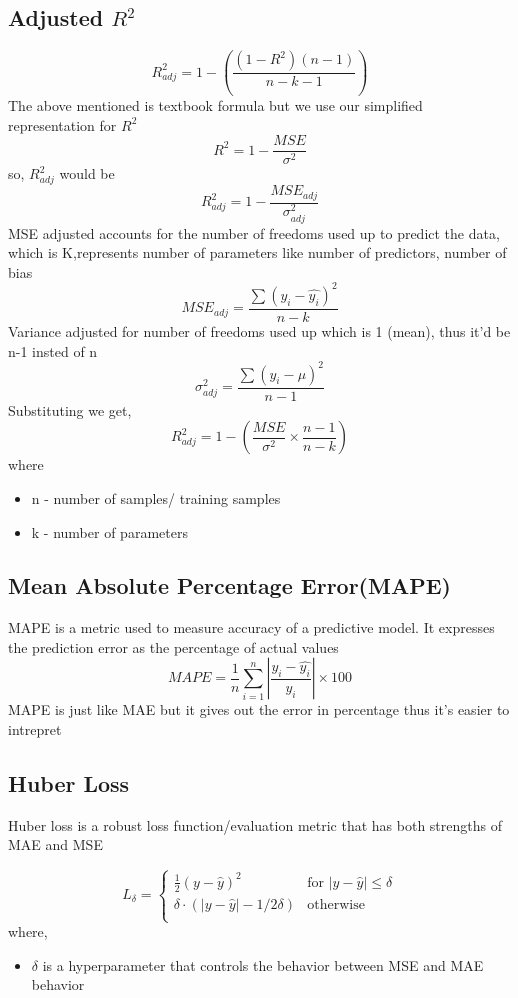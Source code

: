 \documentclass[12pt]{extarticle}
\begin{document}
\subsection{Adjusted \(R^2\)}
$$ R^2_{adj} = 1 - \left(\frac{(1-R^2)(n-1)}{n-k-1}\right) $$
The above mentioned is textbook formula but we use our simplified 
representation for \(R^2\)
$$ R^2 = 1 - \frac{MSE}{\sigma^2} $$
so, \(R^2_{adj}\) would be
$$ R^2_{adj} = 1 - \frac{MSE_{adj}}{\sigma^2_{adj}} $$
MSE adjusted accounts for the number of freedoms used up to predict the data, 
which is K,represents number of parameters like number of predictors, number of bias
$$ MSE_{adj} = \frac{\sum(y_i-\hat{y_i})^2}{n-k} $$
Variance adjusted for number of freedoms used up which is 1 (mean), 
thus it'd be n-1 insted of n
$$ \sigma^2_{adj} = \frac{\sum(y_i-\mu)^2}{n-1} $$
Substituting we get,
$$ R^2_{adj} = 1 - \left(\frac{MSE}{\sigma^2} \times \frac{n-1}{n-k}\right) $$
where 
\begin{itemize}
    \item n - number of samples/ training samples
    \item k - number of parameters
\end{itemize}

\subsection{Mean Absolute Percentage Error(MAPE)}
MAPE is a metric used to measure accuracy of a predictive model. It expresses the 
prediction error as the percentage of actual values
$$ MAPE = \frac{1}{n}\sum_{i=1}^{n}\left|\frac{y_i-\hat{y_i}}{y_i}\right| \times 100 $$
MAPE is just like MAE but it gives out the error in percentage thus it's easier to intrepret 

\subsection{Huber Loss}
Huber loss is a robust loss function/evaluation metric that has both strengths of MAE and MSE


$$
L_\delta = 
\begin{cases} 
    \frac{1}{2}(y-\hat{y})^2 & \text{for }|y-\hat{y}| \le \delta \\
    \delta \cdot (|y-\hat{y}|-1/2 \delta) & \text{otherwise} \\
\end{cases}
$$
where, 
\begin{itemize}
    \item \( \delta \) is a hyperparameter that controls the behavior between 
        MSE and MAE behavior
\end{itemize}
\end{document}
